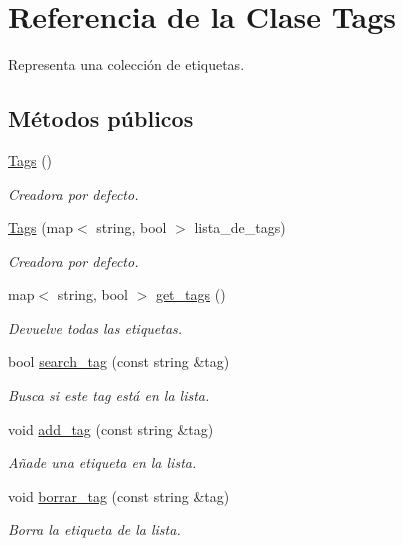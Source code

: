 \hypertarget{class_tags}{\section{Referencia de la Clase Tags}
\label{class_tags}
}


Representa una colección de etiquetas.  


\subsection*{Métodos públicos}
\begin{DoxyCompactItemize}
\item 
\hyperlink{class_tags_a8d3045112662e0ace4b8bafb5a3e8f57}{Tags} ()
\begin{DoxyCompactList}\small\item\em Creadora por defecto. \end{DoxyCompactList}\item 
\hyperlink{class_tags_a55e22736b43fd945ac900a50a3c67509}{Tags} (map$<$ string, bool $>$ lista\-\_\-de\-\_\-tags)
\begin{DoxyCompactList}\small\item\em Creadora por defecto. \end{DoxyCompactList}\item 
map$<$ string, bool $>$ \hyperlink{class_tags_a811129b11acf0ae9c6f224a386075e46}{get\-\_\-tags} ()
\begin{DoxyCompactList}\small\item\em Devuelve todas las etiquetas. \end{DoxyCompactList}\item 
bool \hyperlink{class_tags_aff44c4ae5a949512c893d1fc9ab5312a}{search\-\_\-tag} (const string \&tag)
\begin{DoxyCompactList}\small\item\em Busca si este tag está en la lista. \end{DoxyCompactList}\item 
void \hyperlink{class_tags_a0bbd998942d9415108eae2be28daedd0}{add\-\_\-tag} (const string \&tag)
\begin{DoxyCompactList}\small\item\em Añade una etiqueta en la lista. \end{DoxyCompactList}\item 
void \hyperlink{class_tags_a6b5bf2e8bb405c6396d947543460710b}{borrar\-\_\-tag} (const string \&tag)
\begin{DoxyCompactList}\small\item\em Borra la etiqueta de la lista. \end{DoxyCompactList}\end{DoxyCompactItemize}


